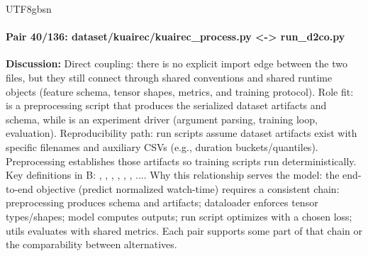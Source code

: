\documentclass[11pt]{article}
\begin{document}
\begin{CJK*}{UTF8}{gbsn}
\paragraph{Pair 40/136: dataset/kuairec/kuairec\_process.py <-> run\_d2co.py}
\textbf{Discussion:} Direct coupling: there is no explicit import edge between the two files, but they still connect through shared conventions and shared runtime objects (feature schema, tensor shapes, metrics, and training protocol). Role fit: \texttt{} is a preprocessing script that produces the serialized dataset artifacts and schema, while \texttt{} is an experiment driver (argument parsing, training loop, evaluation). Reproducibility path: run scripts assume dataset artifacts exist with specific filenames and auxiliary CSVs (e.g., duration buckets/quantiles). Preprocessing establishes those artifacts so training scripts run deterministically. Key definitions in B: \texttt{}, \texttt{}, \texttt{}, \texttt{}, \texttt{}, \texttt{}, .... Why this relationship serves the model: the end-to-end objective (predict normalized watch-time) requires a consistent chain: preprocessing produces schema and artifacts; dataloader enforces tensor types/shapes; model computes outputs; run script optimizes with a chosen loss; utils evaluates with shared metrics. Each pair supports some part of that chain or the comparability between alternatives.


\end{CJK*}
\end{document}
